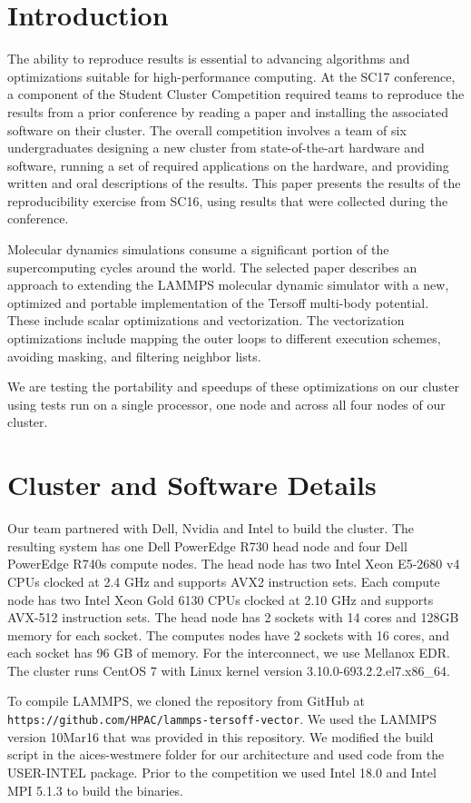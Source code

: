 \documentclass{sig-alternate-05-2015}
\begin{document}
\section{Introduction}
The ability to reproduce results is essential to advancing algorithms and optimizations suitable for high-performance computing.  At the SC17 conference, a component of the Student Cluster Competition required teams to reproduce the results from a prior conference by reading a paper and installing the associated software on their cluster.  The overall competition involves a team of six undergraduates designing a new cluster from state-of-the-art hardware and software, running a set of required applications on the hardware, and providing written and oral descriptions of the results. This paper presents the results of the reproducibility exercise from SC16, using results that were collected during the conference.  

Molecular dynamics simulations consume a significant portion of the supercomputing cycles around the world.  The selected paper describes an approach to extending the LAMMPS molecular dynamic simulator with a new, optimized and portable implementation of the Tersoff multi-body potential.  These  include scalar optimizations and vectorization.  The vectorization optimizations include mapping the outer loops to different execution schemes, avoiding masking, and filtering neighbor lists.   

We are testing the portability and speedups of these optimizations on our cluster using tests run on a single processor, one node and across all four nodes of our cluster.  
\section{Cluster and Software Details}
Our team partnered with Dell, Nvidia and Intel to build the cluster.  The resulting system has one Dell PowerEdge R730 head node and four Dell PowerEdge R740s compute nodes. The head node has two Intel Xeon E5-2680 v4 CPUs clocked at 2.4 GHz and supports AVX2 instruction sets.  Each compute node has two Intel Xeon Gold 6130 CPUs clocked at 2.10 GHz and supports AVX-512 instruction sets. The head node has 2 sockets with 14 cores and 128GB memory for each socket. The computes nodes have 2 sockets with 16 cores, and each socket has 96 GB of memory.  For the interconnect, we use Mellanox EDR. The cluster runs CentOS 7 with Linux kernel version 3.10.0-693.2.2.el7.x86\_64.

To compile LAMMPS, we cloned the repository from GitHub at \texttt{https://github.com/HPAC/lammps-tersoff-vector}.  We used the LAMMPS version 10Mar16 that was provided in this repository.  We modified the build script in the aices-westmere folder for our architecture and used code from the USER-INTEL package.  Prior to the competition we used Intel 18.0 and Intel MPI 5.1.3 to build the binaries.
\end{document}

